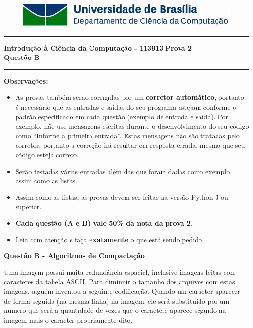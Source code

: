 \documentclass[a4paper, 12pt]{article}
\begin{document}
\begin{figure}[H]
	\includegraphics[scale=0.9]{UnB_CiC_Logo.jpg}
\end{figure}
\noindent\rule{\textwidth}{0.4pt}
\begin{center}
	\textbf{{\Large Introdução à Ciência da Computação - 113913}} \newline \newline
	\textbf{{\large Prova 2} \\
	\vspace{9pt}
	{\large Questão B}} \\
	\noindent\rule{\textwidth}{0.4pt}
	\newline
\end{center}

\textbf{{\large Observações:}}
\begin{itemize}
	\item As provas também serão corrigidas por um \textbf{corretor automático}, portanto é necessário que as entradas e saídas do seu programa estejam conforme o padrão especificado em cada questão (exemplo de entrada e saída). Por exemplo, não use mensagens escritas durante o desenvolvimento do seu código como “Informe a primeira entrada”. Estas mensagens não são tratadas pelo corretor, portanto a correção irá resultar em resposta errada, mesmo que seu código esteja correto.
	\item Serão testadas várias entradas além das que foram dadas como exemplo, assim como as listas.
	\item Assim como as listas, as provas devem ser feitas na versão Python 3 ou superior.
	\item \textbf{Cada questão (A e B) vale 50\% da nota da prova 2}.
	\item Leia com atenção e faça \textbf{exatamente} o que está sendo pedido.
\end{itemize}
\newpage %
\begin{center}
\textbf{{\Large Questão B - Algoritmos de Compactação}}
\end{center}
\vspace{5pt}

Uma imagem possui muita redundância espacial, inclusive imagens feitas com caracteres da tabela ASCII. Para diminuir o tamanho dos arquivos com estas imagens, alguém inventou a seguinte codificação. Quando um caracter aparecer de forma seguida (na mesma linha) na imagem, ele será substituído por um número que será a quantidade de vezes que o caractere aparece seguido na imagem mais o caracter propriamente dito.
\end{document}
